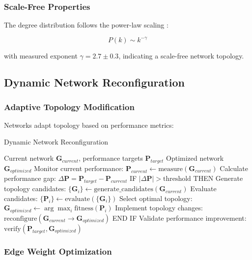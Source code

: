 \documentclass[12pt,a4paper]{article}
\begin{document}
\subsubsection{Scale-Free Properties}

The degree distribution follows the power-law scaling \cite{barabasi1999emergence}:

\begin{equation}
P(k) \sim k^{-\gamma}
\end{equation}

with measured exponent $\gamma = 2.7 \pm 0.3$, indicating a scale-free network topology.

\subsection{Dynamic Network Reconfiguration}

\subsubsection{Adaptive Topology Modification}

Networks adapt topology based on performance metrics:

\begin{algorithm}[H]
\caption{Dynamic Network Reconfiguration}
\begin{algorithmic}[1]
\REQUIRE Current network $\mathbf{G}_{current}$, performance targets $\mathbf{P}_{target}$
\ENSURE Optimized network $\mathbf{G}_{optimized}$
\STATE Monitor current performance: $\mathbf{P}_{current} \leftarrow \text{measure}(\mathbf{G}_{current})$
\STATE Calculate performance gap: $\Delta \mathbf{P} = \mathbf{P}_{target} - \mathbf{P}_{current}$
\STATE IF $|\Delta \mathbf{P}| > \text{threshold}$ THEN
\STATE \quad Generate topology candidates: $\{\mathbf{G}_i\} \leftarrow \text{generate\_candidates}(\mathbf{G}_{current})$
\STATE \quad Evaluate candidates: $\{\mathbf{P}_i\} \leftarrow \text{evaluate}(\{\mathbf{G}_i\})$
\STATE \quad Select optimal topology: $\mathbf{G}_{optimized} \leftarrow \arg\max_i \text{fitness}(\mathbf{P}_i)$
\STATE \quad Implement topology changes: $\text{reconfigure}(\mathbf{G}_{current} \rightarrow \mathbf{G}_{optimized})$
\STATE END IF
\STATE Validate performance improvement: $\text{verify}(\mathbf{P}_{target}, \mathbf{G}_{optimized})$
\end{algorithmic}
\end{algorithm}

\subsubsection{Edge Weight Optimization}
\end{document}
